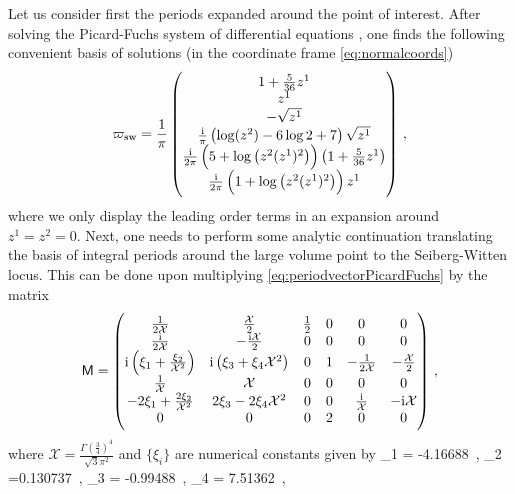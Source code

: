 Let us consider first the periods expanded around the point of interest. After solving the Picard-Fuchs system of differential equations \cite{Cox:2000vi,Hori:2003ic}, one finds the following convenient basis of solutions (in the coordinate frame \eqref{eq:normalcoords})
%
\begin{equation} \label{eq:periodvectorPicardFuchs}
    \varpi_{\rm sw} = \frac{1}{\pi} \begin{pmatrix}
    1 + \frac{5}{36} z^1 \\
    z^1 \\
    -\sqrt{z^1} \\
   \frac{\text{i}}{\pi} \left(\log(z^2) - 6 \log2 + 7\right) \sqrt{z^1}\\
   \frac{\text{i}}{2\pi} \left(5+\log \left(z^2 (z^1)^2 \right)\right) \left( 1 + \frac{5}{36} z^1\right)\\
   \frac{\text{i}}{2\pi} \left(1 + \log \left(z^2 (z^1)^2 \right)\right) z^1
\end{pmatrix}\, ,
\end{equation}
%
where we only display the leading order terms in an expansion around $z^1=z^2=0$. Next, one needs to perform some analytic continuation translating the basis of integral periods around the large volume point to the Seiberg-Witten locus. This can be done upon multiplying \eqref{eq:periodvectorPicardFuchs} by the matrix \cite{Lee:2019wij}
%
\begin{equation} \label{eq:analyticContmatrix}
    \mathsf{M} = \begin{pmatrix}
       \frac{1}{2\mathcal{X}} & \frac{\mathcal{X}}{2} & \frac12 & 0 & 0 & 0 \\
    \frac{\text{i}}{2\mathcal{X}} & -\frac{\text{i} \mathcal{X}}{2} & 0 & 0 & 0 & 0 \\
    \text{i} \left( \xi_1 + \frac{\xi_2}{\mathcal{X}^2}\right) & \text{i} \left( \xi_3 + \xi_4 \mathcal{X}^2\right) & 0 & 1 & -\frac{1}{2\mathcal{X}} & -\frac{\mathcal{X}}{2} \\
    \frac{1}{\mathcal{X}} & \mathcal{X} & 0 & 0 & 0 & 0 \\
    -2\xi_1 + \frac{2\xi_2} {\mathcal{X}^2} & 2 \xi_3-2\xi_4 \mathcal{X}^2 & 0 & 0 & \frac{\text{i}}{\mathcal{X}} & -\text{i} \mathcal{X} \\
    0 & 0 & 0 & 2 & 0 & 0
\end{pmatrix}\, ,
\end{equation}
%
where $\mathcal{X}=\frac{\Gamma \left( \frac34 \right)^4}{\sqrt{3} \pi^2}$ and $\{\xi_i \}$ are numerical constants given by
%
\beq
	\xi_1 = -4.16688\, , \quad \xi_2 =0.130737\, , \quad \xi_3 = -0.99488\, , \quad \xi_4 = 7.51362\, ,
